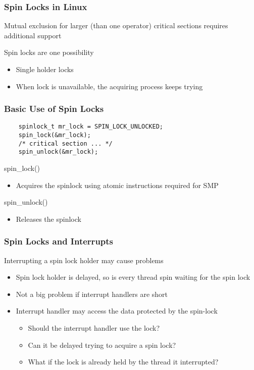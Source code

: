 \begin{frame}[fragile]
    \frametitle{Spin Locks in Linux}
    \Large
    Mutual exclusion for larger (than one operator)
    critical sections requires additional support
    
    Spin locks are one possibility
    \normalsize
    \begin{itemize}
        \item Single holder locks
        \item When lock is unavailable, the acquiring process
        keeps trying
    \end{itemize}    
\end{frame}

\begin{frame}[fragile]
    \frametitle{Basic Use of Spin Locks  }
    \large    
\begin{block}{}
    \begin{verbatim}
    spinlock_t mr_lock = SPIN_LOCK_UNLOCKED;
    spin_lock(&mr_lock);
    /* critical section ... */
    spin_unlock(&mr_lock);
\end{verbatim}
\end{block}        
    
    \Large
    spin\_lock()
    \begin{itemize}
        \item Acquires the spinlock using atomic instructions required
        for SMP
    \end{itemize}    
    spin\_unlock()
\begin{itemize}
    \item Releases the spinlock
\end{itemize} 

\end{frame}


\begin{frame}[fragile]
    \frametitle{Spin Locks and Interrupts}
    \Large
    Interrupting a spin lock holder may cause problems
    \begin{itemize}
        \item  Spin lock holder is delayed, so is every thread
        spin waiting for the spin lock
        \item Not a big problem if interrupt handlers are short
        \item Interrupt handler may access the data
        protected by the spin-lock

        \begin{itemize}
            \item Should the interrupt handler use the lock?
            \item Can it be delayed trying to acquire a spin lock?
            \item What if the lock is already held by the thread it interrupted?           
        \end{itemize}
    \end{itemize}    
\end{frame}

